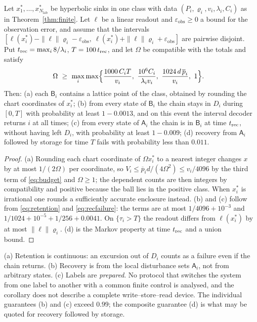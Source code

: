 \begin{corollary}\label{cor:contract}
Let \(x_1^*,\dots,x_{N_{\mathrm{lab}}}^*\) be hyperbolic sinks in one class with data
\((P_i,\varrho_i,v_i,\lambda_i,C_i)\) as in Theorem~\textup{\ref{thm:finite}}. Let
\(\ell\) be a linear readout and \(\varepsilon_{\mathrm{obs}}\ge0\) a bound for the observation
error, and assume that the intervals
\([\ell(x_i^*)-\|\ell\|\varrho_i-\varepsilon_{\mathrm{obs}},\
\ell(x_i^*)+\|\ell\|\varrho_i+\varepsilon_{\mathrm{obs}}]\) are pairwise disjoint. Put
\(t_{\mathrm{rec}}=\max_i8/\lambda_i\), \(T=100\,t_{\mathrm{rec}}\), and let \(\Omega\) be compatible with the totals
and satisfy
\begin{equation}\label{eq:budget}
 \Omega\ \ge\ \max_i\max\Bigl\{\frac{1000\,C_iT}{v_i},\ \frac{10^6C_i}{\lambda_iv_i},\
 \frac{1024\,d\,\overline p_i}{v_i},\ 1\Bigr\}.
\end{equation}
Then: \textup{(a)} each \(\mathsf B_i\) contains a lattice point of the class, obtained by
rounding the chart coordinates of \(x_i^*\); \textup{(b)} from every state of \(\mathsf B_i\)
the chain stays in \(D_i\) during \([0,T]\) with probability at least \(1-0.0013\), and on this
event the interval decoder returns \(i\) at all times; \textup{(c)} from every state of
\(\mathsf A_i\) the chain is in \(\mathsf B_i\) at time \(t_{\mathrm{rec}}\), without having left \(D_i\),
with probability at least \(1-0.009\); \textup{(d)} recovery from \(\mathsf A_i\) followed by
storage for time \(T\) fails with probability less than \(0.011\).
\end{corollary}
\begin{proof}
(a) Rounding each chart coordinate of \(\Omega x_i^*\) to a nearest integer changes \(x\) by at
most \(1/(2\Omega)\) per coordinate, so \(V_i\le\overline p_id/(4\Omega^2)\le v_i/4096\) by the
third term of \eqref{eq:budget} and \(\Omega\ge1\); the dependent counts are then integers by
compatibility and positive because the ball lies in the positive class. When \(x_i^*\) is
irrational one rounds a sufficiently accurate enclosure instead. (b) and (c) follow from
\eqref{eq:retention} and \eqref{eq:recfailure}: the terms are at most
\(1/4096+10^{-3}\) and \(1/1024+10^{-5}+1/256+0.0041\). On \(\{\tau_i>T\}\) the readout differs
from \(\ell(x_i^*)\) by at most \(\|\ell\|\varrho_i\). (d) is the Markov property at time
\(t_{\mathrm{rec}}\) and a union bound.
\end{proof}

\begin{remark}\label{rem:contract}
(a) Retention is continuous: an excursion out of \(D_i\) counts as a failure even if the chain
returns. (b) Recovery is from the local disturbance sets \(\mathsf A_i\), not from arbitrary
states. (c) Labels are \emph{prepared}. No protocol that switches the system from one label to
another with a common finite control is analysed, and the corollary does not describe a
complete write--store--read device. The individual guarantees (b) and (c) exceed \(0.99\); the
composite guarantee (d) is what may be quoted for recovery followed by storage.
\end{remark}

